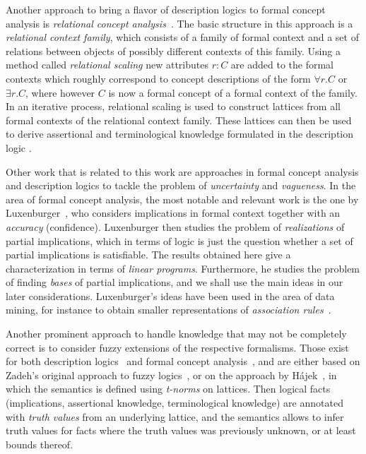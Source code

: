 Another approach to bring a flavor of description logics to formal concept analysis is
\emph{relational concept analysis}~\cite{conf/icfca/RouaneHNV07,
  journals/amai/HaceneHNV13}.  The basic structure in this approach is a \emph{relational
  context family}, which consists of a family of formal context and a set of relations
between objects of possibly different contexts of this family.  Using a method called
\emph{relational scaling} new attributes $r \colon C$ are added to the formal contexts
which roughly correspond to concept descriptions of the form $\forall r. C$ or $\exists
r. C$, where however $C$ is now a formal concept of a formal context of the family.  In an
iterative process, relational scaling is used to construct lattices from all formal
contexts of the relational context family.  These lattices can then be used to derive
assertional and terminological knowledge formulated in the description logic \FLE.

Other work that is related to this work are approaches in formal concept analysis and
description logics to tackle the problem of \emph{uncertainty} and \emph{vagueness}.  In
the area of formal concept analysis, the most notable and relevant work is the one by
Luxenburger~\cite{diss:Luxenburger,Luxenburger91}, who considers implications in formal
context together with an \emph{accuracy} (confidence).  Luxenburger then studies the
problem of \emph{realizations} of partial implications, which in terms of logic is just
the question whether a set of partial implications is satisfiable.  The results obtained
here give a characterization in terms of \emph{linear programs}.  Furthermore, he studies
the problem of finding \emph{bases} of partial implications, and we shall use the main
ideas in our later considerations.  Luxenburger's ideas have been used in the area of data
mining, for instance to obtain smaller representations of \emph{association
  rules}~\cite{DBLP:conf/ki/StummeTBPL01}.

Another prominent approach to handle knowledge that may not be completely correct is to
consider fuzzy extensions of the respective formalisms.  Those exist for both description
logics~\cite{journals/fss/BobilloS09,journals/ws/LukasiewiczS08} and formal concept
analysis~\cite{Pollandt97b,conf/cla/BelohlavekV05}, and are either based on Zadeh's
original approach to fuzzy logics~\cite{journals/iandc/Zadeh65}, or on the approach by
Hájek~\cite{hajek1998metamathematics}, in which the semantics is defined using
\emph{t-norms} on lattices.  Then logical facts (implications, assertional knowledge,
terminological knowledge) are annotated with \emph{truth values} from an underlying
lattice, and the semantics allows to infer truth values for facts where the truth values
was previously unknown, or at least bounds thereof.

